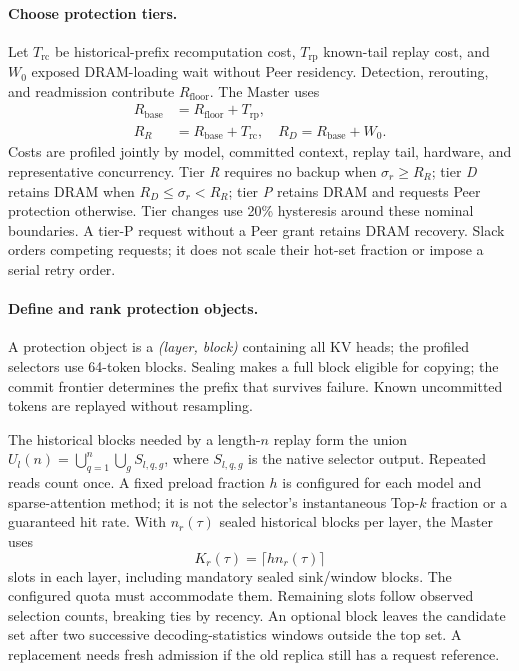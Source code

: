 \paragraph{Choose protection tiers.}
Let $T_{\mathrm{rc}}$ be historical-prefix recomputation cost,
$T_{\mathrm{rp}}$ known-tail replay cost, and $W_0$ exposed DRAM-loading
wait without Peer residency. Detection, rerouting, and readmission
contribute $R_{\mathrm{floor}}$. The Master uses
\begin{equation}
\begin{aligned}
 R_{\mathrm{base}}&=R_{\mathrm{floor}}+T_{\mathrm{rp}},\\
 R_R&=R_{\mathrm{base}}+T_{\mathrm{rc}},\quad
 R_D=R_{\mathrm{base}}+W_0.
\end{aligned}
\label{eq:recovery-base}
\end{equation}
Costs are profiled jointly by model, committed context, replay tail,
hardware, and representative concurrency.
Tier \emph{R} requires no backup when $\sigma_r\ge R_R$;
tier \emph{D} retains DRAM when $R_D\le\sigma_r<R_R$;
tier \emph{P} retains DRAM and requests Peer protection otherwise.
Tier changes use 20\% hysteresis around these nominal boundaries.
A tier-P request without a Peer grant retains DRAM recovery.
Slack orders competing requests; it does not scale their hot-set
fraction or impose a serial retry order.

\paragraph{Define and rank protection objects.}
A protection object is a \emph{(layer, block)} containing all KV heads;
the profiled selectors use 64-token blocks. Sealing makes a full block
eligible for copying; the commit frontier determines the prefix that
survives failure. Known uncommitted tokens are replayed without resampling.

The historical blocks needed by a length-$n$ replay form the union
$U_l(n)=\bigcup_{q=1}^{n}\bigcup_g S_{l,q,g}$, where $S_{l,q,g}$ is the
native selector output. Repeated reads count once. A fixed preload
fraction $h$ is configured for each model and sparse-attention method;
it is not the selector's instantaneous Top-$k$ fraction or a guaranteed
hit rate. With $n_r(\tau)$ sealed historical blocks per layer, the Master uses
\begin{equation}
 K_r(\tau)=\lceil h n_r(\tau)\rceil
 \label{eq:hot-block-count}
\end{equation}
slots in each layer, including mandatory sealed sink/window blocks.
The configured quota must accommodate them. Remaining slots follow
observed selection counts, breaking ties by recency. An optional block
leaves the candidate set after two successive decoding-statistics windows
outside the top set. A replacement needs fresh admission if the old
replica still has a request reference.

